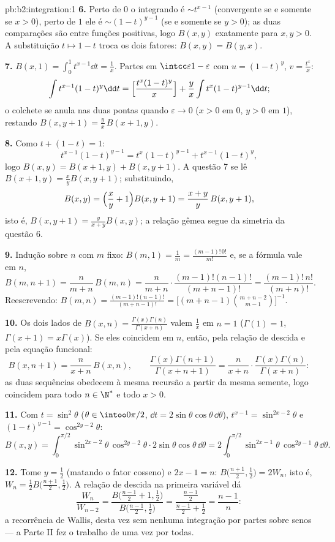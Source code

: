 \begin{solution}{pb:b2:integration:1}
\textbf{6.} Perto de $0$ o integrando é $\sim t^{x-1}$
(convergente se e somente se $x > 0$), perto de $1$ ele é $\sim (1-t)^{y-1}$
(se e somente se $y > 0$); as duas comparações são entre funções positivas,
logo $B(x,y)$  exatamente para $x, y > 0$. A substituição
$t \mapsto 1 - t$ troca os dois fatores: $B(x,y) = B(y,x)$.

\textbf{7.} $B(x,1) = \int_0^1 t^{x-1}\dd t = \frac1x$. Partes
em $\intcc\varepsilon{1-\varepsilon}$ com $u = (1-t)^y$, $v =
\frac{t^x}{x}$:
\[
\int t^{x-1}(1-t)^{y}\dd t
= \Bigl[\frac{t^x(1-t)^y}{x}\Bigr]
+ \frac{y}{x}\int t^{x}(1-t)^{y-1}\dd t ;
\]
o colchete se anula nas duas pontas quando $\varepsilon \to 0$ ($x >
0$ em $0$, $y > 0$ em $1$), restando $B(x, y+1) = \frac
yx\,B(x+1, y)$.

\textbf{8.} Como $t + (1-t) = 1$:
\[
t^{x-1}(1-t)^{y-1} = t^{x}(1-t)^{y-1} + t^{x-1}(1-t)^{y},
\]
logo $B(x,y) = B(x+1,y) + B(x,y+1)$. A questão 7 se lê $B(x+1,y) =
\frac xy B(x,y+1)$; substituindo,
\[
B(x,y) = \Bigl(\frac xy + 1\Bigr)B(x,y+1)
= \frac{x+y}{y}\,B(x,y+1),
\]
isto é, $B(x,y+1) = \frac{y}{x+y}B(x,y)$; a relação gêmea
segue da simetria da questão 6.

\textbf{9.} Indução sobre $n$ com $m$ fixo: $B(m,1) = \frac1m =
\frac{(m-1)!\,0!}{m!}$ e, se a fórmula vale em $n$,
\[
B(m, n+1) = \frac{n}{m+n}\,B(m,n)
= \frac{n}{m+n}\cdot\frac{(m-1)!(n-1)!}{(m+n-1)!}
= \frac{(m-1)!\,n!}{(m+n)!} .
\]
Reescrevendo: $B(m,n) = \frac{(m-1)!(n-1)!}{(m+n-1)!} =
\bigl[(m+n-1)\binom{m+n-2}{m-1}\bigr]^{-1}$.

\textbf{10.} Os dois lados de $B(x,n) =
\frac{\Gamma(x)\Gamma(n)}{\Gamma(x+n)}$ valem $\frac1x$ em $n =
1$ ($\Gamma(1) = 1$, $\Gamma(x+1) = x\Gamma(x)$). Se eles coincidem
em $n$, então, pela relação de descida e pela equação
funcional:
\[
B(x, n+1) = \frac{n}{x+n}\,B(x,n), \qquad
\frac{\Gamma(x)\Gamma(n+1)}{\Gamma(x+n+1)}
= \frac{n}{x+n}\cdot
\frac{\Gamma(x)\Gamma(n)}{\Gamma(x+n)} :
\]
as duas sequências obedecem à mesma recursão a partir da mesma semente,
logo coincidem para todo $n \in \N^*$ e todo $x > 0$.

\textbf{11.} Com $t = \sin^2\theta$ ($\theta \in
\intoo0{\pi/2}$, $\dd t = 2\sin\theta\cos\theta\,\dd\theta$),
$t^{x-1} = \sin^{2x-2}\theta$ e $(1-t)^{y-1} =
\cos^{2y-2}\theta$:
\[
B(x,y) = \int_0^{\pi/2}\sin^{2x-2}\theta\,\cos^{2y-2}\theta
\cdot 2\sin\theta\cos\theta\,\dd\theta
= 2\int_0^{\pi/2}\sin^{2x-1}\theta\,\cos^{2y-1}\theta\,
\dd\theta .
\]

\textbf{12.} Tome $y = \frac12$ (matando o fator cosseno) e
$2x - 1 = n$: $B\bigl(\frac{n+1}2, \frac12\bigr) = 2W_n$, isto é,
$W_n = \frac12 B\bigl(\frac{n+1}2,\frac12\bigr)$. A relação de descida
na primeira variável dá
\[
\frac{W_n}{W_{n-2}}
= \frac{B\bigl(\frac{n-1}2 + 1, \frac12\bigr)}
{B\bigl(\frac{n-1}2, \frac12\bigr)}
= \frac{\frac{n-1}2}{\frac{n-1}2 + \frac12}
= \frac{n-1}{n} :
\]
a recorrência de Wallis, desta vez sem nenhuma integração por partes
sobre senos --- a Parte II fez o trabalho de uma vez por todas.


\end{solution}
